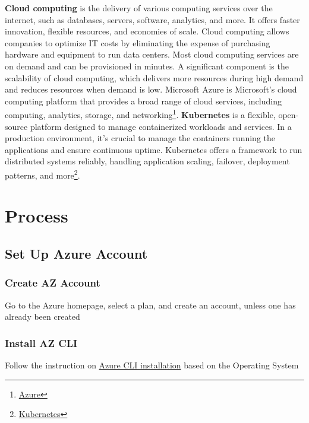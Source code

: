 \documentclass{article}
\begin{document}
\textbf{Cloud computing} is the delivery of various computing services over the internet, such as databases, servers, software, analytics, and more. It offers faster innovation, flexible resources, and economies of scale. Cloud computing allows companies to optimize IT costs by eliminating the expense of purchasing hardware and equipment to run data centers. Most cloud computing services are on demand and can be provisioned in minutes. A significant component is the scalability of cloud computing, which delivers more resources during high demand and reduces resources when demand is low.
Microsoft Azure is Microsoft’s cloud computing platform that provides a broad range of cloud services, including computing, analytics, storage, and networking\footnote{\href{Azure:\thickspace https://www.dimensiona.com/en/what-is-docker-and-what-are-its-advantages/\#:~:text=Docker\%20is\%20a\%20container\%20platform,for\%20it\%20to\%20run\%20independently.}{Azure}}. \textbf{Kubernetes} is a flexible, open-source platform designed to manage containerized workloads and services. In a production environment, it's crucial to manage the containers running the applications and ensure continuous uptime. Kubernetes offers a framework to run distributed systems reliably, handling application scaling, failover, deployment patterns, and more\footnote{\href{https://kubernetes.io/docs/concepts/overview/}{Kubernetes}}.




\section{Process}
	\subsection{Set Up Azure Account}
		\subsubsection{Create AZ Account}
Go to the Azure homepage, select a plan, and create an account, unless one has already been created
		\subsubsection{Install AZ CLI}
Follow the instruction on \href{https://learn.microsoft.com/en-us/cli/azure/install-azure-cli}{Azure CLI installation} based on the Operating System
\end{document}
